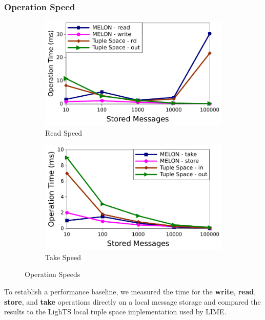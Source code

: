 \documentclass[lnicst]{svmultln}
\begin{document}
\subsubsection{Operation Speed}

\begin{figure}
\centering
\begin{subfigure}{.5\textwidth}
\centering
\includegraphics[width = \linewidth, clip, trim = 0px 0px 0px 0px]{figures/read_speed.pdf}
\caption{Read Speed}
\label{fig:readspeed}
\end{subfigure}%
\begin{subfigure}{.5\textwidth}
\centering
\includegraphics[width = \linewidth, clip, trim = 0px 0px 0px 0px]{figures/in_speed.pdf}
\caption{Take Speed}
\label{fig:takespeed}
\end{subfigure}

\caption{Operation Speeds}
\end{figure}

To establish a performance baseline, we measured the time for the \textbf{write}, \textbf{read}, \textbf{store}, and \textbf{take} operations directly on a local message storage and compared the results to the LighTS\cite{lights} local tuple space implementation used by LIME\cite{lime}.
\end{document}
